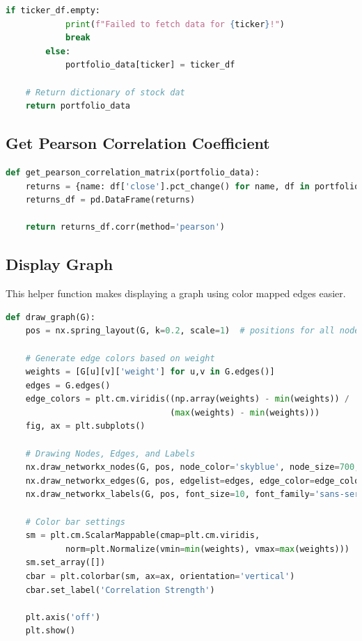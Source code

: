 \documentclass{article}
\begin{document}
\begin{appendices}
\begin{lstlisting}[language=Python]
        if ticker_df.empty:
            print(f"Failed to fetch data for {ticker}!")
            break
        else:
            portfolio_data[ticker] = ticker_df
    
    # Return dictionary of stock dat 
    return portfolio_data
\end{lstlisting}


\subsection{Get Pearson Correlation Coefficient}

\begin{lstlisting}[language=python]
def get_pearson_correlation_matrix(portfolio_data):
    returns = {name: df['close'].pct_change() for name, df in portfolio_data.items()}
    returns_df = pd.DataFrame(returns)

    return returns_df.corr(method='pearson')
\end{lstlisting}

\subsection{Display Graph}
This helper function makes displaying a graph using color mapped edges easier.

\begin{lstlisting}[language=python]
def draw_graph(G):
    pos = nx.spring_layout(G, k=0.2, scale=1)  # positions for all nodes

    # Generate edge colors based on weight
    weights = [G[u][v]['weight'] for u,v in G.edges()]
    edges = G.edges()
    edge_colors = plt.cm.viridis((np.array(weights) - min(weights)) / 
                                 (max(weights) - min(weights)))
    fig, ax = plt.subplots()

    # Drawing Nodes, Edges, and Labels
    nx.draw_networkx_nodes(G, pos, node_color='skyblue', node_size=700, ax=ax)
    nx.draw_networkx_edges(G, pos, edgelist=edges, edge_color=edge_colors, ax=ax)
    nx.draw_networkx_labels(G, pos, font_size=10, font_family='sans-serif', ax=ax)

    # Color bar settings
    sm = plt.cm.ScalarMappable(cmap=plt.cm.viridis, 
            norm=plt.Normalize(vmin=min(weights), vmax=max(weights)))
    sm.set_array([])
    cbar = plt.colorbar(sm, ax=ax, orientation='vertical')  
    cbar.set_label('Correlation Strength')

    plt.axis('off')
    plt.show()
\end{lstlisting}


\end{appendices}
\end{document}
